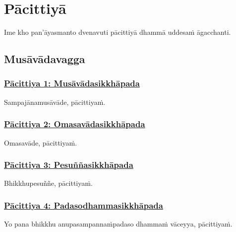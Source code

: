 
\section{Pācittiyā}
\label{pc}

\begin{intro}
	Ime kho pan'āyasmanto dvenavuti pācittiyā dhammā uddesaṁ āgacchanti.
\end{intro}

\subsection{Musāvādavagga}

\subsubsection*{\hyperref[exp1]{Pācittiya 1: Musāvādasikkhāpada}}
\label{pac1}

Sampajānamusāvāde, pācittiyaṁ.



\subsubsection*{\hyperref[exp2]{Pācittiya 2: Omasavādasikkhāpada}}
\label{pac2}

Omasavāde, pācittiyaṁ.



\subsubsection*{\hyperref[exp3]{Pācittiya 3: Pesuññasikkhāpada}}
\label{pac3}

Bhikkhupesuññe, pācittiyaṁ.



\subsubsection*{\hyperref[exp4]{Pācittiya 4: Padasodhammasikkhāpada}}
\label{pac4}

Yo pana bhikkhu anupasampannaṁ\makeatletter\hyperlink{endnote226-appendix}\makeatother \thinspace padaso dhammaṁ vāceyya, pācittiyaṁ.



